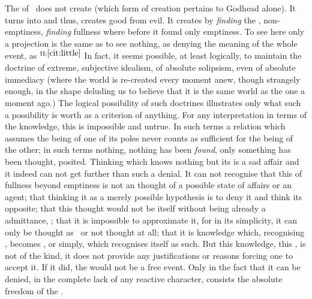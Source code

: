  The  of \yes\ does not create  (which form of creation
 pertains to Godhead alone). It turns  into  and thus, creates good from evil.  It creates
  by {\em finding} the , non-emptiness, {\em
   finding} fullness where before it found only emptiness.  To see here only a
 projection is the same as to see nothing, as denying the meaning of the whole
 event, as $^{{\rm{II}}:\ref{cit:little}}$  In fact, it seems possible, at least
 logically, to maintain the 
 doctrine of extreme, subjective idealism, of absolute solipsism, even of
 absolute immediacy (where the world is re-created every moment anew, though
 strangely enough, in the shape deluding us to believe that it is the same world
 as the one a moment ago.) The logical possibility of such doctrines illustrates
 only what such a possibility is worth as a criterion of anything.  For any
 interpretation in terms of the  knowledge, this  is
 impossible and untrue. In such terms a relation which assumes the being of one of
 its poles never counts as sufficient for the being of the other; in such terms
 nothing, nothing  has been {\em found}, only something has been
 thought,  posited. Thinking which knows nothing but its
  is a sad affair and it indeed can not get further than
 such a denial. It can not recognise that this  of fullness beyond
 emptiness is not an  thought of a possible state of affairs or an
  agent; that thinking it as a merely possible hypothesis is to deny
 it and think its opposite; that this thought would not be itself without being
 already a  admittance, ; that it is impossible to
 approximate it, for in its simplicity, it can only be thought as \yes\ or not
 thought at all; that it is knowledge which, {recognising} ,
 becomes , or simply,  which {recognises}
 itself as such. But this knowledge, this , is not of the 
 kind, it does not provide any  justifications or reasons forcing
 one to accept it. If it did, the  would not be a 
 free event. Only in the fact that it can be denied, in the complete lack of any
 reactive character, consists the absolute freedom of the \sch.


